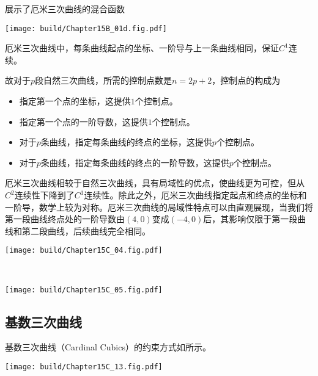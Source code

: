 展示了厄米三次曲线的混合函数
\begin{Figure}[厄米三次曲线的混合函数]
    \texttt{[image: build/Chapter15B\_01d.fig.pdf]}
\end{Figure}

厄米三次曲线中，每条曲线起点的坐标、一阶导与上一条曲线相同，保证$C^1$连续。

故对于$p$段自然三次曲线，所需的控制点数是$n=2p+2$，控制点的构成为
\begin{itemize}
    \item 指定第一个点的坐标，这提供$1$个控制点。
    \item 指定第一个点的一阶导数，这提供$1$个控制点。
    \item 对于$p$条曲线，指定每条曲线的终点的坐标，这提供$p$个控制点。
    \item 对于$p$条曲线，指定每条曲线的终点的一阶导数，这提供$p$个控制点。
\end{itemize}
厄米三次曲线相较于自然三次曲线，具有局域性的优点，使曲线更为可控，但从$C^2$连续性下降到了$C^1$连续性。除此之外，厄米三次曲线指定起点和终点的坐标和一阶导，数学上较为对称。厄米三次曲线的局域性特点可以由直观展现，当我们将第一段曲线终点处的一阶导数由$(4,0)$变成$(-4,0)$后，其影响仅限于第一段曲线和第二段曲线，后续曲线完全相同。

\begin{Figure}[厄米三次曲线构成的分段曲线]
    \begin{FigureSub}[设定1;自然设定1]
        \texttt{[image: build/Chapter15C\_04.fig.pdf]}
    \end{FigureSub}\\ \vspace{0.25cm}
    \begin{FigureSub}[设定2;自然设定2]
        \texttt{[image: build/Chapter15C\_05.fig.pdf]}
    \end{FigureSub}
\end{Figure}

\subsection{基数三次曲线}
基数三次曲线（Cardinal Cubics）的约束方式如所示。

\begin{Figure}[基数三次曲线]
    \texttt{[image: build/Chapter15C\_13.fig.pdf]}
\end{Figure}

